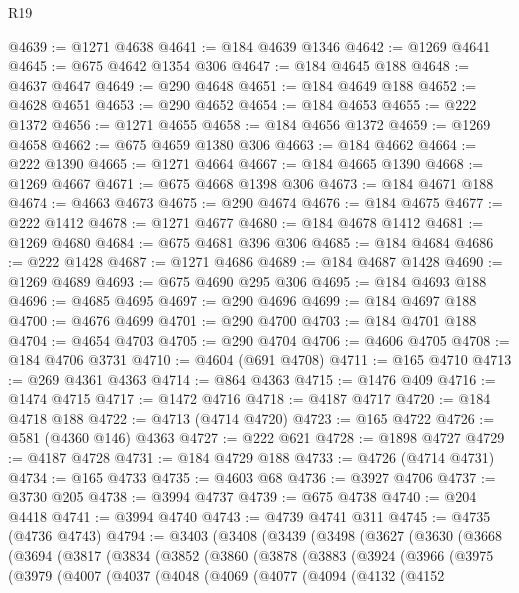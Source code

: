\begin{lexlean}{R19}
\begin{coremodule}
@4639 := @1271 @4638
@4641 := @184 @4639 @1346
@4642 := @1269 @4641
@4645 := @675 @4642 @1354 @306
@4647 := @184 @4645 @188
@4648 := @4637 @4647
@4649 := @290 @4648
@4651 := @184 @4649 @188
@4652 := @4628 @4651
@4653 := @290 @4652
@4654 := @184 @4653
@4655 := @222 @1372
@4656 := @1271 @4655
@4658 := @184 @4656 @1372
@4659 := @1269 @4658
@4662 := @675 @4659 @1380 @306
@4663 := @184 @4662
@4664 := @222 @1390
@4665 := @1271 @4664
@4667 := @184 @4665 @1390
@4668 := @1269 @4667
@4671 := @675 @4668 @1398 @306
@4673 := @184 @4671 @188
@4674 := @4663 @4673
@4675 := @290 @4674
@4676 := @184 @4675
@4677 := @222 @1412
@4678 := @1271 @4677
@4680 := @184 @4678 @1412
@4681 := @1269 @4680
@4684 := @675 @4681 @396 @306
@4685 := @184 @4684
@4686 := @222 @1428
@4687 := @1271 @4686
@4689 := @184 @4687 @1428
@4690 := @1269 @4689
@4693 := @675 @4690 @295 @306
@4695 := @184 @4693 @188
@4696 := @4685 @4695
@4697 := @290 @4696
@4699 := @184 @4697 @188
@4700 := @4676 @4699
@4701 := @290 @4700
@4703 := @184 @4701 @188
@4704 := @4654 @4703
@4705 := @290 @4704
@4706 := @4606 @4705
@4708 := @184 @4706 @3731
@4710 := @4604 (@691 @4708)
@4711 := @165 @4710
@4713 := @269 @4361 @4363
@4714 := @864 @4363
@4715 := @1476 @409
@4716 := @1474 @4715
@4717 := @1472 @4716
@4718 := @4187 @4717
@4720 := @184 @4718 @188
@4722 := @4713 (@4714 @4720)
@4723 := @165 @4722
@4726 := @581 (@4360 @146) @4363
@4727 := @222 @621
@4728 := @1898 @4727
@4729 := @4187 @4728
@4731 := @184 @4729 @188
@4733 := @4726 (@4714 @4731)
@4734 := @165 @4733
@4735 := @4603 @68
@4736 := @3927 @4706
@4737 := @3730 @205
@4738 := @3994 @4737
@4739 := @675 @4738
@4740 := @204 @4418
@4741 := @3994 @4740
@4743 := @4739 @4741 @311
@4745 := @4735 (@4736 @4743)
@4794 := @3403
    (@3408
      (@3439
        (@3498
          (@3627
            (@3630
              (@3668
                (@3694
                  (@3817
                    (@3834
                      (@3852
                        (@3860
                          (@3878
                            (@3883
                              (@3924
                                (@3966
                                  (@3975
                                    (@3979
                                      (@4007
                                        (@4037
                                          (@4048
                                            (@4069
                                              (@4077
                                                (@4094
                                                  (@4132
                                                    (@4152

\end{coremodule}
\end{lexlean}
